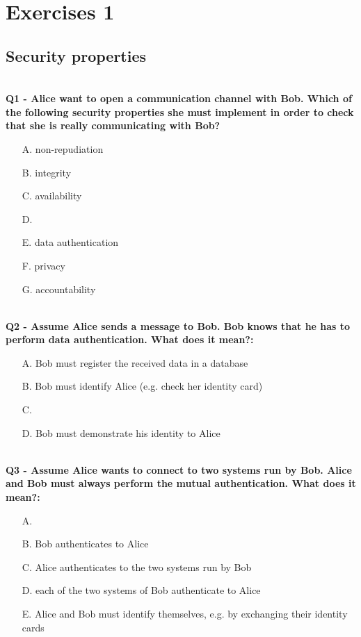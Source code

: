 \chapter{Exercises 1}

\section{Security properties}

\textbf{\\Q1 - Alice want to open a communication channel with Bob. Which of the following 
security properties she must implement in order to check that she is really communicating with Bob?}
\begin{enumerate}
\item[A.] non-repudiation
\item[B.] integrity
\item[C.] availability
\item[D.] 
\item[E.] data authentication
\item[F.] privacy
\item[G.] accountability

\end{enumerate}


\textbf{\\Q2 - Assume Alice sends a message to Bob. Bob knows that he
has to perform data authentication. What does it mean?:}
\begin{enumerate}
    \item[A.] Bob must register the received data in a database
    \item[B.] Bob must identify Alice (e.g. check her identity card)
    \item[C.] 
    \item[D.] Bob must demonstrate his identity to Alice
\end{enumerate}    

\textbf{\\Q3 - Assume Alice wants to connect to two systems run by Bob. Alice and Bob must always perform the mutual authentication. What does it mean?:}
\begin{enumerate}
    \item[A.] 
    \item[B.] Bob authenticates to Alice
    \item[C.] Alice authenticates to the two systems run by Bob
    \item[D.] each of the two systems of Bob authenticate to Alice
    \item[E.] Alice and Bob must identify themselves, e.g. by exchanging their identity cards
\end{enumerate}

